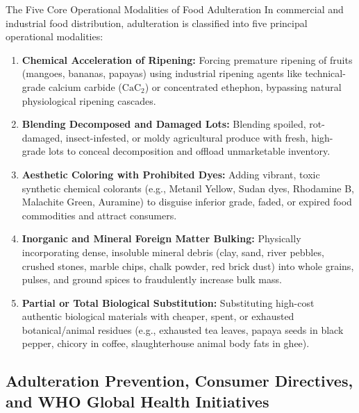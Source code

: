 \documentclass[11pt,a4paper,oneside]{article}
\begin{document}
\begin{defbox}{The Five Core Operational Modalities of Food Adulteration}
In commercial and industrial food distribution, adulteration is classified into five principal operational modalities:
\begin{enumerate}[leftmargin=*]
    \item \textbf{Chemical Acceleration of Ripening:} Forcing premature ripening of fruits (mangoes, bananas, papayas) using industrial ripening agents like technical-grade calcium carbide ($\mathrm{CaC_2}$) or concentrated ethephon, bypassing natural physiological ripening cascades.
    \item \textbf{Blending Decomposed and Damaged Lots:} Blending spoiled, rot-damaged, insect-infested, or moldy agricultural produce with fresh, high-grade lots to conceal decomposition and offload unmarketable inventory.
    \item \textbf{Aesthetic Coloring with Prohibited Dyes:} Adding vibrant, toxic synthetic chemical colorants (e.g., Metanil Yellow, Sudan dyes, Rhodamine B, Malachite Green, Auramine) to disguise inferior grade, faded, or expired food commodities and attract consumers.
    \item \textbf{Inorganic and Mineral Foreign Matter Bulking:} Physically incorporating dense, insoluble mineral debris (clay, sand, river pebbles, crushed stones, marble chips, chalk powder, red brick dust) into whole grains, pulses, and ground spices to fraudulently increase bulk mass.
    \item \textbf{Partial or Total Biological Substitution:} Substituting high-cost authentic biological materials with cheaper, spent, or exhausted botanical/animal residues (e.g., exhausted tea leaves, papaya seeds in black pepper, chicory in coffee, slaughterhouse animal body fats in ghee).
\end{enumerate}
\end{defbox}

\subsection{Adulteration Prevention, Consumer Directives, and WHO Global Health Initiatives}
\end{document}
